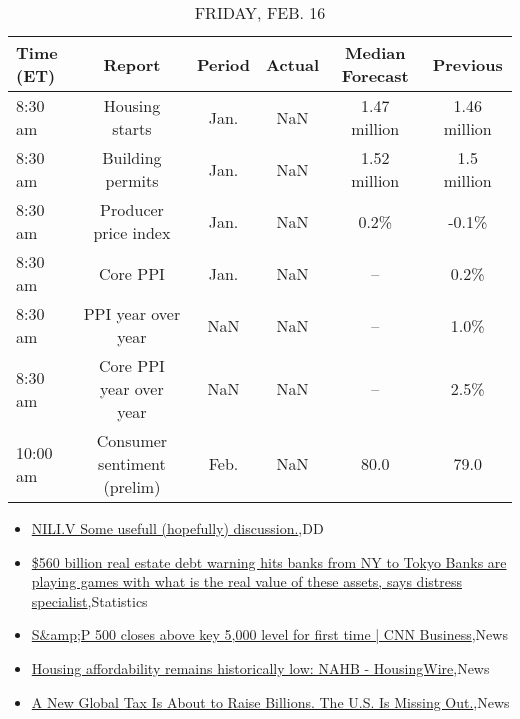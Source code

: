 \documentclass{article}%
\begin{document}
\begin{table}[htbp]%
\caption{FRIDAY, FEB. 16}%
\centering%
\begin{adjustbox}{width=1\textwidth}%
\begin{tabular}{lccccc}
\toprule
Time (ET) &                      Report & Period & Actual & Median Forecast &     Previous \\
\midrule
  8:30 am &              Housing starts &   Jan. &    NaN &    1.47 million & 1.46 million \\
  8:30 am &            Building permits &   Jan. &    NaN &    1.52 million &  1.5 million \\
  8:30 am &        Producer price index &   Jan. &    NaN &            0.2\% &        -0.1\% \\
  8:30 am &                    Core PPI &   Jan. &    NaN &              -- &         0.2\% \\
  8:30 am &          PPI year over year &    NaN &    NaN &              -- &         1.0\% \\
  8:30 am &     Core PPI year over year &    NaN &    NaN &              -- &         2.5\% \\
 10:00 am & Consumer sentiment (prelim) &   Feb. &    NaN &            80.0 &         79.0 \\
\bottomrule
\end{tabular}
%
\end{adjustbox}%
\end{table}

%
\begin{itemize}%
\item%
\href{https://reddit.com/r/Baystreetbets/comments/1amravs/niliv\_some\_usefull\_hopefully\_discussion/}{NILI.V Some usefull (hopefully) discussion.},DD%
\item%
\href{https://reddit.com/r/Economics/comments/1amzral/560\_billion\_real\_estate\_debt\_warning\_hits\_banks/}{\$560 billion real estate debt warning hits banks from NY to Tokyo  Banks are playing games with what is the real value of these assets, says distress specialist},Statistics%
\item%
\href{https://reddit.com/r/Economics/comments/1amyy96/sp\_500\_closes\_above\_key\_5000\_level\_for\_first\_time/}{S\&amp;P 500 closes above key 5,000 level for first time | CNN Business},News%
\item%
\href{https://reddit.com/r/Economics/comments/1amwqhh/housing\_affordability\_remains\_historically\_low/}{Housing affordability remains historically low: NAHB - HousingWire},News%
\item%
\href{https://reddit.com/r/Economics/comments/1amw3k9/a\_new\_global\_tax\_is\_about\_to\_raise\_billions\_the/}{A New Global Tax Is About to Raise Billions. The U.S. Is Missing Out.},News%
\end{itemize}%
\end{document}
